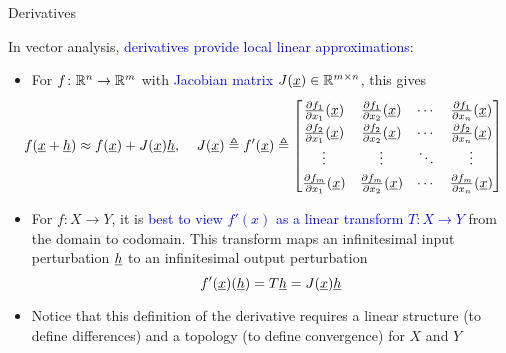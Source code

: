 \documentclass[10pt,english,aspectratio=169]{beamer}
\begin{document}
\begin{frame}{Derivatives}

In vector analysis, \textcolor{blue}{derivatives provide local linear approximations}: \vspace{1mm}
\begin{itemize}
\setlength\itemsep{4mm}
\item<1-> For $f\colon \mathbb{R}^n \to \mathbb{R}^m$ with \textcolor{blue}{Jacobian matrix} $J(\underline{x})\in \mathbb{R}^{m\times n}$, this gives \vspace{-1mm}
\[ \begingroup \renewcommand*{\arraystretch}{1.35} \!\!\!\!\!\!\! f(\vecnot{x} + \vecnot{h}) \approx f(\vecnot{x}) + J(\vecnot{x}) \vecnot{h}, \;\;\;\;
J(\vecnot{x})\triangleq f'(\vecnot{x}) \triangleq  \begin{bmatrix} \frac{\partial  f_1}{\partial  x_1} (\vecnot{x}) & \frac{\partial  f_1}{\partial  x_2} (\vecnot{x}) & \cdots & \frac{\partial  f_1}{\partial  x_n} (\vecnot{x}) \\
\frac{\partial  f_2}{\partial  x_1} (\vecnot{x}) & \frac{\partial  f_2}{\partial  x_2} (\vecnot{x}) & \cdots & \frac{\partial  f_2}{\partial  x_n} (\vecnot{x}) \\
\vdots & \vdots & \ddots & \vdots \\
\frac{\partial  f_m}{\partial  x_1} (\vecnot{x}) & \frac{\partial  f_m}{\partial  x_2} (\vecnot{x}) & \cdots & \frac{\partial  f_m}{\partial  x_n} (\vecnot{x}) \end{bmatrix} \endgroup \]

\item<2-> For $f \colon X \to Y$, it is \textcolor{blue}{best to view $f'(x)$ as a linear transform $T \colon X \to Y$} from the domain to codomain.
This transform maps an infinitesimal input perturbation $\underline{h}$ to an infinitesimal output perturbation \vspace{-1mm}
$$f'(\underline{x})(\underline{h}) = T \underline{h} = J(\underline{x}) \underline{h}$$
 
\item<3-> Notice that this definition of the derivative requires a linear structure (to define differences) and a topology (to define convergence) for $X$ and $Y$


\end{itemize}
\end{frame}
\end{document}
